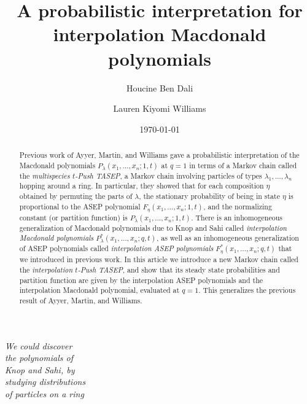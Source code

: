 \documentclass[12pt]{amsart}
\author[]{}
\title[A probabilistic interpretation for interpolation Macdonald polynomials]{A probabilistic interpretation for\\ interpolation Macdonald polynomials}
\date{\today}
\author{Houcine Ben Dali}
\author{Lauren Kiyomi Williams}
\theoremstyle{definition}
\begin{document}
\begin{abstract}
Previous work of Ayyer, Martin, and Williams gave a probabilistic interpretation of the Macdonald polynomials $P_{\lambda}(x_1,\dots,x_n;1,t)$ at $q=1$ in terms of a Markov chain called the \emph{multispecies $t$-Push TASEP}, a Markov chain involving particles of types $\lambda_1,\dots,\lambda_n$ hopping around a ring.  In particular, they showed that for each composition $\eta$ obtained by permuting the parts of $\lambda$, the stationary probability of being in state $\eta$ is proportional to the ASEP polynomial $F_{\eta}(x_1,\dots,x_n; 1,t)$, and the normalizing constant (or partition function) is $P_{\lambda}(x_1,\dots,x_n; 1,t)$.  There is an inhomogeneous generalization of Macdonald polynomials due to Knop and Sahi called \emph{interpolation Macdonald polynomials} $P^*_{\lambda}(x_1,\dots,x_n;q,t)$, as well as an inhomogeneous generalization of ASEP polynomials called \emph{interpolation ASEP polynomials} $F^*_{\eta}(x_1,\dots,x_n;q,t)$ that we introduced in previous work.  In this article 
we introduce a new Markov chain called the \emph{interpolation $t$-Push TASEP}, and show that its steady state probabilities and partition function are given by the interpolation ASEP polynomials and the interpolation Macdonald polynomial, evaluated at $q=1$.  This generalizes the previous result of Ayyer, Martin, and Williams.





\end{abstract}


\maketitle


\begin{center}
\begin{minipage}{0.33\textwidth}
 \begin{center}
  \emph{We could discover\\ the polynomials of \\ 
  Knop and Sahi, by \\ studying distributions \\
  of particles on a ring}
     \end{center}
\end{minipage}
\end{center}



 \setcounter{tocdepth}{1}
 \tableofcontents
\end{document}
